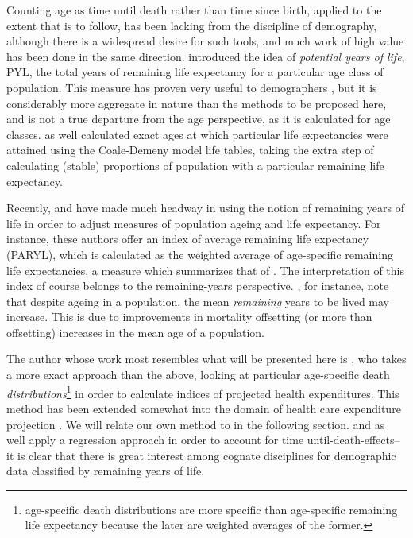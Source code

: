 Counting age as time until death rather than time
since birth, applied to the extent that is to
follow, has been lacking from the discipline of demography, although there is a
widespread desire for such tools, and much work of high value has been done in
the same direction. \citet{hersch1944demographie}
introduced the idea of \textit{potential years of life}, PYL, the
total years of remaining life expectancy for a particular age class of
population. This measure has proven very useful to demographers
\citep{panush1996potential}, but it is considerably more aggregate in 
nature than the methods to be proposed
here, and is not a true departure from the age perspective, as it is calculated
for age classes. \citet{ryder1975notes} as well calculated exact ages at which
particular life expectancies were attained using the Coale-Demeny model
life tables, taking the extra step of calculating (stable) proportions
of population with a particular remaining life expectancy.

Recently, 
\citet{sanderson2005average,sanderson2010remeasuring} and have made much headway
 in using the notion of remaining years of life in
 order to adjust measures of population ageing and life expectancy. For instance, 
 these authors offer an index of average remaining life expectancy (PARYL), which 
 is calculated as the weighted average of age-specific 
 remaining life expectancies, a measure which summarizes that of
 \citet{hersch1944demographie}. The interpretation of this index of
 course belongs to the remaining-years perspective.
 \citet{sanderson2005average}, for instance, note that despite ageing 
 in a population, the mean \textit{remaining} years to 
 be lived may increase. This is due to improvements in mortality offsetting 
 (or more than offsetting) increases in the mean age of a population.

The author whose work most resembles what will be
presented here is \citet{miller2001increasing}, who takes a more
exact approach than the above, looking at particular age-specific death
\textit{distributions}\footnote{age-specific death distributions are more
 specific than age-specific remaining life expectancy because the later are weighted 
 averages of the former.} in order to calculate indices
 of projected health expenditures. This method has been extended somewhat into
 the domain of health care expenditure projection
 \citep{lee2002approach,lee2007demographic,topoleski2004uncertainty}. We will
 relate our own method to \citet{miller2001increasing} in the
 following section. \citet{stearns2004time} and \citet{seshamani2004longitudinal} as well apply a regression approach in
 order to account for time until-death-effects-- it is clear that there is great
 interest among cognate disciplines for demographic data classified by remaining
 years of life.
 
